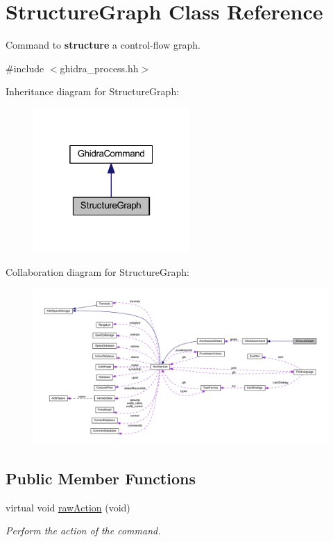 \hypertarget{class_structure_graph}{}\section{Structure\+Graph Class Reference}
\label{class_structure_graph}


Command to {\bfseries{structure}} a control-\/flow graph.  




{\ttfamily \#include $<$ghidra\+\_\+process.\+hh$>$}



Inheritance diagram for Structure\+Graph\+:
\nopagebreak
\begin{figure}[H]
\begin{center}
\leavevmode
\includegraphics[width=169pt]{class_structure_graph__inherit__graph}
\end{center}
\end{figure}


Collaboration diagram for Structure\+Graph\+:
\nopagebreak
\begin{figure}[H]
\begin{center}
\leavevmode
\includegraphics[width=350pt]{class_structure_graph__coll__graph}
\end{center}
\end{figure}
\subsection*{Public Member Functions}
\begin{DoxyCompactItemize}
\item 
virtual void \mbox{\hyperlink{class_structure_graph_a498c9004314b3845ca36c46f77b43ed6}{raw\+Action}} (void)
\begin{DoxyCompactList}\small\item\em Perform the action of the command. \end{DoxyCompactList}\end{DoxyCompactItemize}
